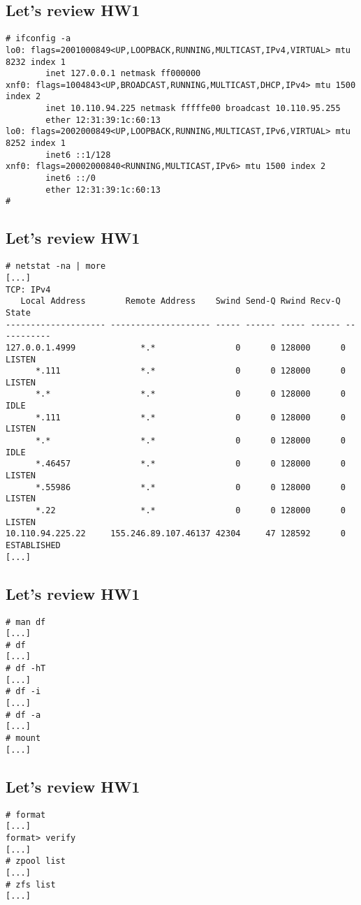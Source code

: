 \documentclass[xga]{xdvislides}
\begin{document}
\subsection{Let's review HW1}
\begin{verbatim}
# ifconfig -a
lo0: flags=2001000849<UP,LOOPBACK,RUNNING,MULTICAST,IPv4,VIRTUAL> mtu 8232 index 1
        inet 127.0.0.1 netmask ff000000
xnf0: flags=1004843<UP,BROADCAST,RUNNING,MULTICAST,DHCP,IPv4> mtu 1500 index 2
        inet 10.110.94.225 netmask fffffe00 broadcast 10.110.95.255
        ether 12:31:39:1c:60:13
lo0: flags=2002000849<UP,LOOPBACK,RUNNING,MULTICAST,IPv6,VIRTUAL> mtu 8252 index 1
        inet6 ::1/128
xnf0: flags=20002000840<RUNNING,MULTICAST,IPv6> mtu 1500 index 2
        inet6 ::/0
        ether 12:31:39:1c:60:13
#
\end{verbatim}


\subsection{Let's review HW1}
\begin{verbatim}
# netstat -na | more
[...]
TCP: IPv4
   Local Address        Remote Address    Swind Send-Q Rwind Recv-Q
State
-------------------- -------------------- ----- ------ ----- ------ -----------
127.0.0.1.4999             *.*                0      0 128000      0 LISTEN
      *.111                *.*                0      0 128000      0 LISTEN
      *.*                  *.*                0      0 128000      0 IDLE
      *.111                *.*                0      0 128000      0 LISTEN
      *.*                  *.*                0      0 128000      0 IDLE
      *.46457              *.*                0      0 128000      0 LISTEN
      *.55986              *.*                0      0 128000      0 LISTEN
      *.22                 *.*                0      0 128000      0 LISTEN
10.110.94.225.22     155.246.89.107.46137 42304     47 128592      0 ESTABLISHED
[...]
\end{verbatim}

\subsection{Let's review HW1}
\begin{verbatim}
# man df
[...]
# df
[...]
# df -hT
[...]
# df -i
[...]
# df -a
[...]
# mount
[...]
\end{verbatim}


\subsection{Let's review HW1}
\begin{verbatim}
# format
[...]
format> verify
[...]
# zpool list
[...]
# zfs list
[...]
\end{verbatim}
\end{document}
